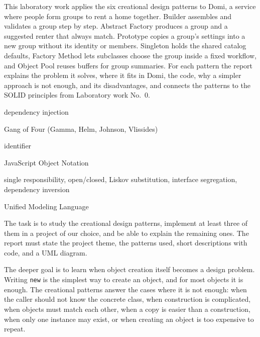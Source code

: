 \documentclass{utmreport}
\providecommand{\passthrough}[1]{#1}
\begin{document}
\makeutmreporttitlepage
\tableofcontents
\begin{utmabstract}[Abstract]
This laboratory work applies the six creational design patterns to Domi, a service where people form groups to rent a home together. Builder assembles and validates a group step by step. Abstract Factory produces a group and a suggested renter that always match. Prototype copies a group's settings into a new group without its identity or members. Singleton holds the shared catalog defaults, Factory Method lets subclasses choose the group inside a fixed workflow, and Object Pool reuses buffers for group summaries. For each pattern the report explains the problem it solves, where it fits in Domi, the code, why a simpler approach is not enough, and its disadvantages, and connects the patterns to the SOLID principles from Laboratory work No.~0.

\end{utmabstract}

\begin{utmabbreviations}
\item[DI] dependency injection
\item[GoF] Gang of Four (Gamma, Helm, Johnson, Vlissides)
\item[ID] identifier
\item[JSON] JavaScript Object Notation
\item[SOLID] single responsibility, open/closed, Liskov substitution, interface segregation, dependency inversion
\item[UML] Unified Modeling Language
\end{utmabbreviations}

\utmintroduction
The task is to study the creational design patterns, implement at least three of them in a project of our choice, and be able to explain the remaining ones. The report must state the project theme, the patterns used, short descriptions with code, and a UML diagram.

The deeper goal is to learn when object creation itself becomes a design problem. Writing \passthrough{\lstinline!new!} is the simplest way to create an object, and for most objects it is enough. The creational patterns answer the cases where it is not enough: when the caller should not know the concrete class, when construction is complicated, when objects must match each other, when a copy is easier than a construction, when only one instance may exist, or when creating an object is too expensive to repeat.
\end{document}
